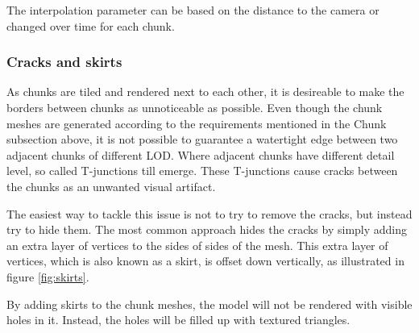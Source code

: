 The interpolation parameter can be based on the distance to the camera or changed over time for each chunk.

\subsubsection{Cracks and skirts}
\label{section:cracksandskirts}
As chunks are tiled and rendered next to each other, it is desireable to make the borders between chunks as unnoticeable as possible. Even though the chunk meshes are generated according to the requirements mentioned in the Chunk subsection above, it is not possible to guarantee a watertight edge between two adjacent chunks of different LOD. Where adjacent chunks have different detail level, so called T-junctions till emerge. These T-junctions cause cracks between the chunks as an unwanted visual artifact.

The easiest way to tackle this issue is not to try to remove the cracks, but instead try to hide them. The most common approach hides the cracks by simply adding an extra layer of vertices to the sides of sides of the mesh. This extra layer of vertices, which is also known as a skirt, is offset down vertically, as illustrated in figure \ref{fig:skirts}. 

By adding skirts to the chunk meshes, the model will not be rendered with visible holes in it. Instead, the holes will be filled up with textured triangles.

